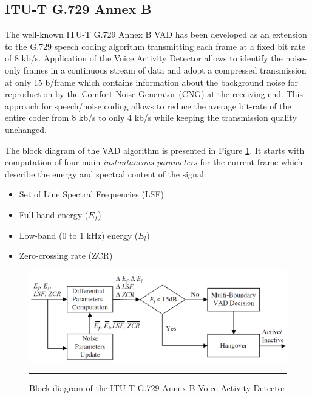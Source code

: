 \subsection{ITU-T G.729 Annex B}

The well-known ITU-T G.729 Annex B VAD has been developed as an extension to the G.729 speech coding algorithm \citep{G729Original} transmitting each frame at a fixed bit rate of 8 kb/s. Application of the Voice Activity Detector allows to identify the noise-only frames in a continuous stream of data and adopt a compressed transmission at only 15 b/frame which contains information about the background noise for reproduction by the Comfort Noise Generator (CNG) at the receiving end. This approach for speech/noise coding allows to reduce the average bit-rate of the entire coder from 8 kb/s to only 4 kb/s while keeping the transmission quality unchanged.

The block diagram of the VAD algorithm is presented in Figure \ref{fig:G729AnnexB}. It starts with computation of four main \emph{instantaneous parameters} for the current frame which describe the energy and spectral content of the signal:
\begin{itemize}
\item Set of Line Spectral Frequencies (LSF)
\item Full-band energy ($E_f$)
\item Low-band (0 to 1 kHz) energy ($E_l$)
\item Zero-crossing rate (ZCR)
\end{itemize}

\begin{figure}[htbp]
	\centering
		\includegraphics[width=0.9\columnwidth]{Figures/G729AnnexB.png}
		\rule{37em}{0.5pt}
	\caption[Block diagram of the ITU-T G.729 Annex B Voice Activity Detector]{Block diagram of the ITU-T G.729 Annex B Voice Activity Detector \cite{Kondoz}}
	\label{fig:G729AnnexB}
\end{figure}

